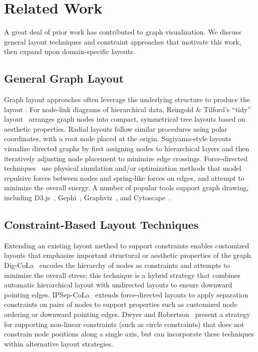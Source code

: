 \vspace{-5px}
\section{Related Work}
A great deal of prior work has contributed to graph visualization.
We discuss general layout techniques and constraint approaches
that motivate this work, then expand upon domain-specific layouts.

\vspace{-5px}
\subsection{General Graph Layout}
Graph layout approaches often leverage the underlying structure to produce the 
layout \cite{herman2000graph,eades2010graph,gibson2013survey}.
For node-link diagrams of hierarchical data, Reingold \& Tilford's ``tidy'' 
layout~\cite{reingold1981tidier} arranges graph nodes into compact, 
symmetrical tree layouts based on aesthetic properties.
Radial layouts \cite{battista1998graph,herman2000graph} follow similar procedures using polar 
coordinates, with a root node placed at the origin.
Sugiyama-style layouts~\cite{sugiyama1981methods} visualize directed graphs by first assigning nodes to hierarchical layers and then iteratively adjusting node placement to minimize edge crossings.
Force-directed techniques~\cite{tutte1963draw,kobourov2012spring,quinn1979forced,fruchterman1991graph} 
use physical simulation and/or optimization methods that model repulsive forces between nodes and spring-like forces on edges, and attempt to minimize the overall energy. 
A number of popular tools support graph drawing, including D3.js~\cite{bostock:d3}, Gephi~\cite{bastian2009gephi},
Graphviz~\cite{ellson2001graphviz}, and Cytoscape~\cite{shannon2003cytoscape}.

\subsection{Constraint-Based Layout Techniques}
Extending an existing layout method to support constraints enables customized 
layouts that emphasize important structural or aesthetic properties of the graph. 
Dig-CoLa~\cite{dwyer2005dig} encodes the hierarchy of nodes as constraints
and attempts to minimize the overall stress; this technique
is a hybrid strategy that combines automatic hierarchical 
layout with undirected layouts to ensure downward pointing edges. 
\mbox{IPSep-CoLa~\cite{dwyer2006ipsep}} extends
force-directed layouts to apply separation constraints 
on pairs of nodes to support properties such as customized node ordering or
downward pointing edges.
Dwyer and Robertson~\cite{dwyer2009layout} present a strategy for supporting 
non-linear constraints (such as circle constraints) that does not constrain node
positions along a single axis, but can incorporate these techniques within
alternative layout strategies. 

